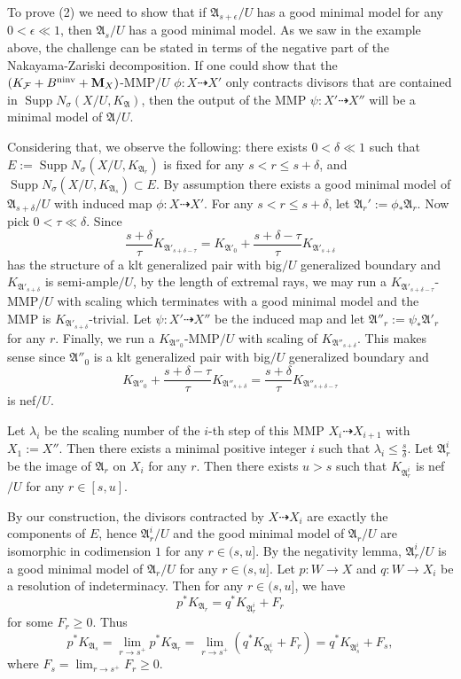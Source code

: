 \documentclass[12pt]{amsart}
\numberwithin{equation}{section}
\newcommand{\Mm}{{\bf{M}}}
\newcommand{\ninv}{\operatorname{ninv}}
\newcommand{\Supp}{\operatorname{Supp}}
\newcommand{\Aa}{{\mathfrak{A}}}
\newcommand{\Ff}{\mathcal{F}}
\theoremstyle{definition}
\theoremstyle{definition}
\theoremstyle{definition}
\begin{document}
To prove (2) we need to show that if $\Aa_{s+\epsilon}/U$ has a good minimal model for any $0<\epsilon\ll 1$, then $\Aa_s/U$ has a good minimal model.
As we saw in the example above, the challenge can be stated in terms of the negative part of the Nakayama-Zariski decomposition.  If one could show that 
the $(K_{\Ff}+B^{\ninv}+\Mm_X)$-MMP$/U$ $\phi\colon X \dashrightarrow X'$ only contracts divisors that are contained in $\Supp N_{\sigma}(X/U,K_{\Aa})$, then the output of the MMP $\psi\colon X' \dashrightarrow X''$ will be a minimal model of $\Aa/U$.

Considering that, we observe the following: there exists $0<\delta\ll 1$ such that $E:=\Supp N_{\sigma}(X/U,K_{\Aa_r})$ is fixed for any $s<r\leq s+\delta$, and $\Supp N_{\sigma}(X/U,K_{\Aa_{s}})\subset E$. By assumption there exists a good minimal model of $\Aa_{s+\delta}/U$ with induced map $\phi\colon X\dashrightarrow X'$.  For any $s<r\leq s+\delta$, let $\Aa_r':=\phi_*\Aa_r$. Now pick $0<\tau\ll\delta$. Since
$$\frac{s+\delta}{\tau}K_{\Aa'_{s+\delta-\tau}}=K_{\Aa'_{0}}+\frac{s+\delta-\tau}{\tau}K_{\Aa'_{s+\delta}}$$
has the structure of a klt generalized pair with big$/U$ generalized boundary and $K_{\Aa'_{s+\delta}}$ is semi-ample$/U$, by the length of extremal rays, we may run a $K_{\Aa'_{s+\delta-\tau}}$-MMP$/U$ with scaling which terminates with a good minimal model and the MMP is $K_{\Aa'_{s+\delta}}$-trivial. Let $\psi\colon X'\dashrightarrow X''$ be the induced map and let $\Aa''_r:=\psi_*\Aa'_r$ for any $r$. Finally, we run a $K_{\Aa''_0}$-MMP$/U$ with scaling of $K_{\Aa''_{s+\delta}}$. This makes sense since $\Aa''_0$ is a klt generalized pair with big$/U$ generalized boundary and
$$K_{\Aa''_0}+\frac{s+\delta-\tau}{\tau}K_{\Aa''_{s+\delta}}=\frac{s+\delta}{\tau}K_{\Aa''_{s+\delta-\tau}}$$
is nef$/U$.

Let $\lambda_i$ be the scaling number of the $i$-th step of this MMP $X_i\dashrightarrow X_{i+1}$ with $X_1:=X''$. Then there exists a minimal positive integer $i$ such that
$\lambda_{i}\leq\frac{s}{\delta}$. Let $\Aa^i_r$ be the image of $\Aa_r$ on $X_i$ for any $r$. Then there exists $u>s$ such that $K_{\Aa^i_{r}}$ is nef$/U$ for any $r\in [s,u]$.

By our construction, the divisors contracted by $X\dashrightarrow X_i$ are exactly the components of $E$, hence $\Aa^i_r/U$ and the good minimal model of $\Aa_r/U$ are isomorphic in codimension $1$ for any $r\in (s,u]$. By the negativity lemma, $\Aa^i_r/U$ is a good minimal model of $\Aa_r/U$ for any $r\in (s,u]$. Let $p\colon W\rightarrow X$ and $q\colon  W\rightarrow X_i$ be a resolution of indeterminacy. Then for any $r\in (s,u]$, we have
$$p^*K_{\Aa_r}=q^*K_{\Aa^i_r}+F_r$$
for some $F_r\geq 0$. Thus
$$p^*K_{\Aa_{s}}=\lim_{r\rightarrow s^+}p^*K_{\Aa_r}=\lim_{r\rightarrow s^+}(q^*K_{\Aa^i_r}+F_r)=q^*K_{\Aa^i_{s}}+F_{s},$$
where $F_{s}=\lim_{r\rightarrow s^+}F_r\geq 0$. 
\end{document}
